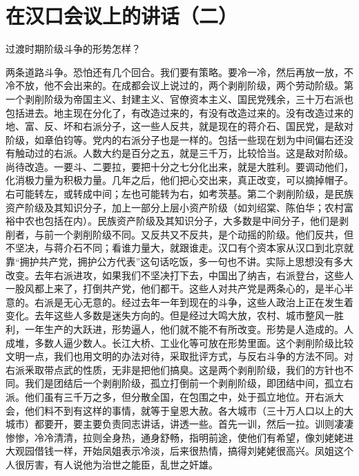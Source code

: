 \section[在汉口会议上的讲话（二）（一九五八年四月六日）]{在汉口会议上的讲话（二）}

过渡时期阶级斗争的形势怎样？

两条道路斗争。恐怕还有几个回合。我们要有策略。要冷一冷，然后再放一放，不冷不放，他不会出来的。在成都会议上说过的，两个剥削阶级，两个劳动阶级。第一个剥削阶级为帝国主义、封建主义、官僚资本主义、国民党残余，三十万右派也包括进去。地主现在分化了，有改造过来的，有没有改造过来的。没有改造过来的地、富、反、坏和右派分子，这一些人反共，就是现在的蒋介石、国民党，是敌对阶级，如章伯钧等。党内的右派分子也是一样的。包括一些现在划为中间偏右还没有触动过的右派。人数大约是百分之五，就是三千万，比较恰当。这是敌对阶级。尚待改造。一要斗、二要拉，要把十分之七分化出来，就是大胜利。要调动他们，化消极力量为积极力量。几年之后，他们把心交出来，真正改变，可以摘掉帽子。右可能转左，或转成中间；左也可能转为右，如考茨基。第二个剥削阶级，是民族资产阶级及其知识分子，加上一部分上层小资产阶级（如刘绍棠、陈伯华；农村富裕中农也包括在内）。民族资产阶级及其知识分子，大多数是中间分子，他们是剥削者，与前一个剥削阶级不同。又反共又不反共，是个动摇的阶级。他们反共，但不坚决，与蒋介石不同；看谁力量大，就跟谁走。汉口有个资本家从汉口到北京就靠“拥护共产党，拥护公方代表”这句话吃饭，多一句也不讲。实际上思想没有多大改变。去年右派进攻，如果我们不坚决打下去，中国出了纳吉，右派登台，这些人一股风都上来了，打倒共产党，他们都干。这些人对共产党是两条心的，是半心半意的。右派是无心无意的。经过去年一年到现在的斗争，这些人政治上正在发生着变化。去年这些人多数是迷失方向的。但是经过大鸣大放，农村、城市整风一胜利，一年生产的大跃进，形势逼人，他们就不能不有所改变。形势是人造成的。人成堆，多数人逼少数人。长江大桥、工业化等可放在形势里面。这个剥削阶级比较文明一点，我们也用文明的办法对待，采取批评方式，与反右斗争的方法不同。对右派釆取带点武的性质，无非是把他们搞臭。这是两个剥削阶级，我们的方针也不同。我们是团结后一个剥削阶级，孤立打倒前一个剥削阶级，即团结中间，孤立右派。他们虽有三千万之多，但分散全国，在包围之中，处于孤立地位。开右派大会，他们料不到有这样的事情，就等于皇恩大赦。各大城市（三十万人口以上的大城市）都要开，要主要负责同志讲话，讲透一些。首先一训，然后一拉。训则凄凄惨惨，冷冷清清，拉则全身热，通身舒畅，指明前途，使他们有希望，像刘姥姥进大观园借钱一样，开始凤姐表示冷淡，后来很热情，搞得刘姥姥很高兴。凤姐这个人很厉害，有人说他为治世之能臣，乱世之奸雄。

